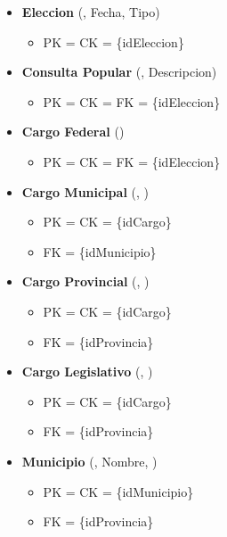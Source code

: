 \begin{itemize}
	\item \textbf{Eleccion} (, Fecha, Tipo) 
	\begin{itemize}
		\item PK = CK = \{idEleccion\}
	\end{itemize}
	\vspace{1mm}

	\item \textbf{Consulta Popular} (, Descripcion) 
	\begin{itemize}
		\item PK = CK = FK = \{idEleccion\}
	\end{itemize}
	\vspace{1mm}

	\item \textbf{Cargo Federal} () 
	\begin{itemize}
		\item PK = CK = FK = \{idEleccion\}
	\end{itemize}
	\vspace{1mm}

	\item \textbf{Cargo Municipal} (, ) 
	\begin{itemize}
		\item PK = CK = \{idCargo\}
		\item FK = \{idMunicipio\}
	\end{itemize}
	\vspace{1mm}

	\item \textbf{Cargo Provincial} (, ) 
	\begin{itemize}
		\item PK = CK = \{idCargo\}
		\item FK = \{idProvincia\}
	\end{itemize}
	\vspace{1mm}

	\item \textbf{Cargo Legislativo} (, ) 
	\begin{itemize}
		\item PK = CK = \{idCargo\}
		\item FK = \{idProvincia\}
	\end{itemize}
	\vspace{1mm}
	 
	\item \textbf{Municipio} (, Nombre, ) 
	\begin{itemize}
		\item PK = CK = \{idMunicipio\}
		\item FK = \{idProvincia\}
	\end{itemize}
	\vspace{1mm}


\end{itemize}
